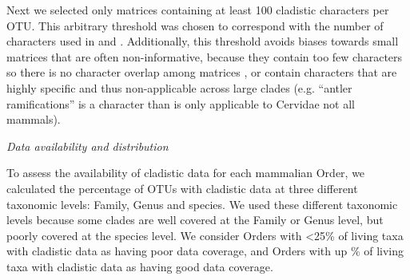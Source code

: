 \documentclass[12pt,letterpaper]{article}
\renewcommand{\subsection}[1]{%
\bigskip
\begin{center}
\begin{large}
\normalfont\itshape #1
\end{large}
\end{center}}
\renewcommand{\subsubsection}[1]{%
\vspace{2ex}
\noindent
\textit{#1.}---}
\begin{document}
Next we selected only matrices containing at least 100 cladistic characters per OTU.
This arbitrary threshold was chosen to correspond with the number of characters used in \citep{GuillermeCooper} and \citep{harrisonamong-character2014}.
Additionally, this threshold avoids biases towards small matrices that are often non-informative, because they contain too few characters so there is no character overlap among matrices \citep{wagner2000}, or contain characters that are highly specific and thus non-applicable across large clades \citep{Brazeau2011} (e.g. ``antler ramifications'' is a character than is only applicable to Cervidae not all mammals).


\subsection{Data availability and distribution}
To assess the availability of cladistic data for each mammalian Order, we calculated the percentage of OTUs with cladistic data at three different taxonomic levels: Family, Genus and species.
We used these different taxonomic levels because some clades are well covered at the Family or Genus level, but poorly covered at the species level.
We consider Orders with \textless 25\% of living taxa with cladistic data as having poor data coverage, and Orders with up \% of living taxa with cladistic data as having good data coverage. 
\end{document}
